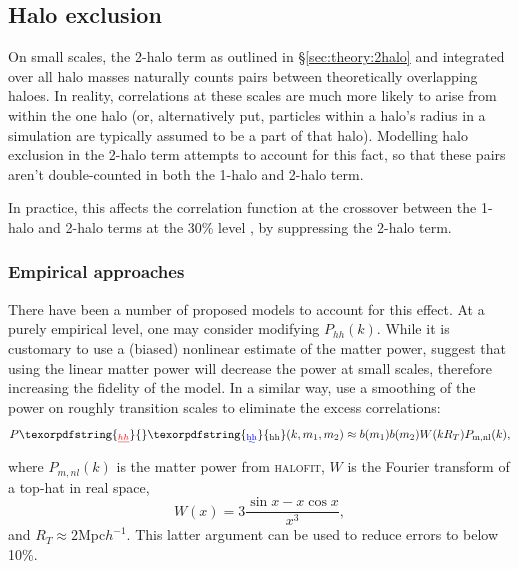 \documentclass[5p,aas_macros]{elsarticle}
\newcommand{\bd}[1]{\textcolor{purple}{\textbf{[BD: #1]}}}
\newcommand{\sgm}[1]{\textcolor{green}{\textbf{[SM: #1]}}}
\providecommand{\DIFaddtex}[1]{{\protect\color{blue}\uwave{#1}}} %
\providecommand{\DIFdeltex}[1]{{\protect\color{red}\sout{#1}}}                      %
\providecommand{\DIFaddbegin}{} %
\providecommand{\DIFaddend}{} %
\providecommand{\DIFdelbegin}{} %
\providecommand{\DIFdelend}{} %
\providecommand{\DIFadd}[1]{\texorpdfstring{\DIFaddtex{#1}}{#1}} %
\providecommand{\DIFdel}[1]{\texorpdfstring{\DIFdeltex{#1}}{}} %
\begin{document}

\subsection{Halo exclusion}
\label{sec:theory:exclusion}
On small scales, the 2-halo term as outlined in \S\ref{sec:theory:2halo} and integrated over all halo masses naturally counts pairs between theoretically overlapping haloes. In reality, correlations at these scales are much more likely to arise from within the one halo (or, alternatively put, particles within a halo's radius in a simulation are typically assumed to be a part of that halo).
Modelling halo exclusion in the 2-halo term attempts to account for this fact, so that these pairs aren't double-counted in both the 1-halo and 2-halo term. %

In practice, this affects the correlation function at the crossover between the 1-halo and 2-halo terms at the 30\% level \citep{Schneider2012}, by suppressing the 2-halo term. 


\subsubsection{Empirical approaches}
There have been a number of proposed models to account for this effect. At a purely empirical level, one may consider modifying \DIFdelbegin \DIFdel{$P_{hh}(k)$}\DIFdelend \DIFaddbegin \DIFadd{$P_{\rm hh}(k)$}\DIFaddend . While it is customary to use a (biased) nonlinear estimate of the matter power, \citet{Cooray2002} suggest that using the linear matter power  will decrease the power at small scales, therefore increasing the fidelity of the model. In a similar way, \citet{Schneider2013} use a smoothing of the power on roughly transition scales to eliminate the excess correlations:
\begin{equation}
    P\DIFdelbegin \DIFdel{_{hh}}\DIFdelend \DIFaddbegin \DIFadd{_{\rm hh}}\DIFaddend (k,m_1,m_2) \approx b(m_1)b(m_2) W(kR_T) P_{\rm m, nl}(k),
\end{equation}
where $P_{m, nl}(k)$ is the matter power from \textsc{halofit}, $W$ is the Fourier transform of a top-hat in real space,
\begin{equation}
    W(x) = 3\frac{\sin x - x\cos x}{x^3},
\end{equation}
and $R_T\approx2 $Mpc$h^{-1}$.
This latter argument can be used to reduce errors to below 10\%.
\end{document}
